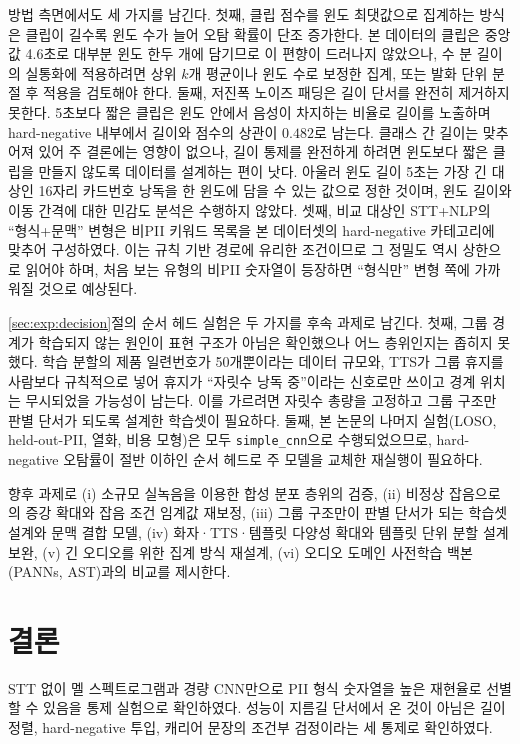 \documentclass[10pt,twocolumn]{article}
\begin{document}
방법 측면에서도 세 가지를 남긴다. 첫째, 클립 점수를 윈도 최댓값으로 집계하는 방식은 클립이
길수록 윈도 수가 늘어 오탐 확률이 단조 증가한다. 본 데이터의 클립은 중앙값 4.6초로 대부분 윈도
한두 개에 담기므로 이 편향이 드러나지 않았으나, 수 분 길이의 실통화에 적용하려면 상위 $k$개
평균이나 윈도 수로 보정한 집계, 또는 발화 단위 분절 후 적용을 검토해야 한다. 둘째, 저진폭 노이즈
패딩은 길이 단서를 완전히 제거하지 못한다. 5초보다 짧은 클립은 윈도 안에서 음성이 차지하는
비율로 길이를 노출하며 hard-negative 내부에서 길이와 점수의 상관이 $0.482$로 남는다. 클래스 간 길이는 맞추어져 있어 주 결론에는 영향이 없으나, 길이 통제를 완전하게 하려면 윈도보다
짧은 클립을 만들지 않도록 데이터를 설계하는 편이 낫다. 아울러 윈도 길이 5초는 가장 긴 대상인
16자리 카드번호 낭독을 한 윈도에 담을 수 있는 값으로 정한 것이며, 윈도 길이와 이동 간격에 대한
민감도 분석은 수행하지 않았다. 셋째, 비교 대상인 STT+NLP의 ``형식+문맥'' 변형은 비PII
키워드 목록을 본 데이터셋의 hard-negative 카테고리에 맞추어 구성하였다. 이는 규칙 기반 경로에
유리한 조건이므로 그 정밀도 역시 상한으로 읽어야 하며, 처음 보는 유형의 비PII 숫자열이 등장하면
``형식만'' 변형 쪽에 가까워질 것으로 예상된다.

\ref{sec:exp:decision}절의 순서 헤드 실험은 두 가지를 후속 과제로 남긴다. 첫째, 그룹 경계가
학습되지 않는 원인이 표현 구조가 아님은 확인했으나 어느 층위인지는 좁히지 못했다. 학습 분할의
제품 일련번호가 50개뿐이라는 데이터 규모와, TTS가 그룹 휴지를 사람보다 규칙적으로 넣어 휴지가
``자릿수 낭독 중''이라는 신호로만 쓰이고 경계 위치는 무시되었을 가능성이 남는다. 이를 가르려면
자릿수 총량을 고정하고 그룹 구조만 판별 단서가 되도록 설계한 학습셋이 필요하다. 둘째, 본 논문의
나머지 실험(LOSO, held-out-PII, 열화, 비용 모형)은 모두 \texttt{simple\_cnn}으로 수행되었으므로,
hard-negative 오탐률이 절반 이하인 순서 헤드로 주 모델을 교체한 재실행이 필요하다.

향후 과제로 (i) 소규모 실녹음을 이용한 합성 분포 층위의 검증, (ii) 비정상 잡음으로의 증강 확대와
잡음 조건 임계값 재보정, (iii) 그룹 구조만이 판별 단서가 되는 학습셋 설계와 문맥 결합 모델, (iv)
화자·TTS·템플릿 다양성 확대와 템플릿 단위 분할 설계 보완, (v) 긴 오디오를 위한 집계 방식 재설계,
(vi) 오디오 도메인 사전학습 백본(PANNs, AST)과의 비교를 제시한다.

\section{결론}\label{sec:conclusion}
STT 없이 멜 스펙트로그램과 경량 CNN만으로 PII 형식 숫자열을 높은 재현율로 선별할 수 있음을 통제
실험으로 확인하였다. 성능이 지름길 단서에서 온 것이 아님은 길이 정렬, hard-negative 투입, 캐리어
문장의 조건부 검정이라는 세 통제로 확인하였다.
\end{document}
